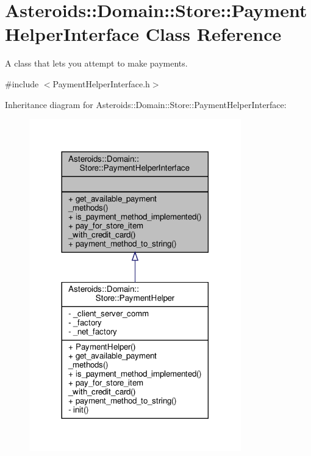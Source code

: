 \hypertarget{classAsteroids_1_1Domain_1_1Store_1_1PaymentHelperInterface}{}\section{Asteroids\+:\+:Domain\+:\+:Store\+:\+:Payment\+Helper\+Interface Class Reference}
\label{classAsteroids_1_1Domain_1_1Store_1_1PaymentHelperInterface}


A class that lets you attempt to make payments.  




{\ttfamily \#include $<$Payment\+Helper\+Interface.\+h$>$}



Inheritance diagram for Asteroids\+:\+:Domain\+:\+:Store\+:\+:Payment\+Helper\+Interface\+:\nopagebreak
\begin{figure}[H]
\begin{center}
\leavevmode
\includegraphics[width=260pt]{classAsteroids_1_1Domain_1_1Store_1_1PaymentHelperInterface__inherit__graph}
\end{center}
\end{figure}


